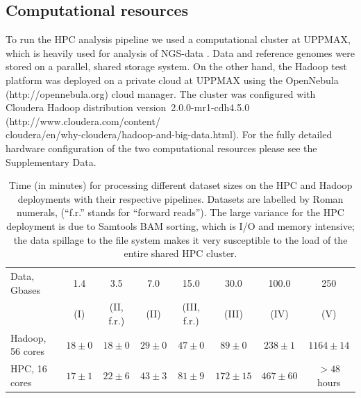 \documentclass{bioinfo}
\begin{document}
\begin{methods}
\subsection*{Computational resources}
To run the HPC analysis pipeline we used a computational cluster at UPPMAX,
which is heavily used for analysis of NGS-data \citep{lampa}.
Data and reference genomes were stored on a parallel, shared storage system.
On the other hand, the Hadoop test platform was deployed on a private cloud at
UPPMAX using the OpenNebula (http://opennebula.org) cloud manager. The cluster was
configured with Cloudera Hadoop distribution version~2.0.0-mr1-cdh4.5.0 (http://www.cloudera.com/content/\\cloudera/en/why-cloudera/hadoop-and-big-data.html).
For the fully detailed hardware configuration of the two computational resources
please see the Supplementary Data.


\end{methods}





\begin{table}
\small

\caption{%
	Time (in minutes) for processing different dataset sizes on the HPC and
	Hadoop deployments with their respective pipelines. Datasets are labelled by
	Roman numerals, (``f.r.'' stands for ``forward reads''). The large variance
	for the HPC deployment is due to Samtools BAM sorting, which is I/O and memory
	intensive; the data spillage to the file system makes it very susceptible to
	the load of the entire shared HPC cluster.
	}

\begin{center}
\begin{tabular}{l|c|c|c|c|c|c|c}

Data, Gbases		&	1.4	&	3.5		&	7.0		&	15.0		&	30.0		&	100.0	&	250 	\\
				&	(I)	&	(II, f.r.)	&	(II)		&	(III, f.r.)	&	(III)		&	(IV)		&	(V)\\
\hline
Hadoop, 56 cores		&	$18\pm0	$	&	$18\pm0	$	&	$29\pm0$	&	$47\pm0	$	&	$89\pm0$	&	$238\pm1$		&	$1164\pm14$\\
HPC, 16 cores	&	$17\pm1$	&	$22\pm6$	&	$43\pm3$	&	$81\pm9$	&	$172\pm15$		&	$467\pm60$	& $>48$ hours\\

\end{tabular}
\end{center}
\label{table:pipleline-timings}
\normalsize
\end{table}%
\end{document}
